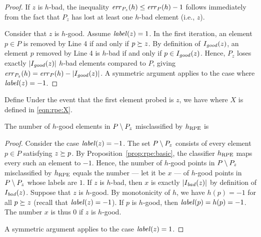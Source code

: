     \begin{proof}
        If $z$ is $h$-bad, the inequality $\mathit{err}_{P_z}(h) \le \mathit{err}_P(h) - 1$ follows immediately from the fact that $P_z$ has lost at least one $h$-bad element (i.e., $z$).

        \vgap

        Consider that $z$ is $h$-good. Assume $\mathit{label}(z) = 1$. In the first iteration, an element $p \in P$ is removed by Line 4 if and only if $p \succeq z$. By definition of $I_\mathit{good}(z)$, an element $p$ removed by Line 4 is $h$-bad if and only if $p \in I_\mathit{good}(z)$. Hence, $P_z$ loses exactly $|I_\mathit{good}(z)|$ $h$-bad elements compared to $P$, giving $\mathit{err}_{P_z}(h) = \mathit{err}_P(h) - |I_\mathit{good}(z)|$. A symmetric argument applies to the case where $\mathit{label}(z) = -1$.
    \end{proof}

    Define
    Under the event that the first element probed is $z$, we have
    where $X$ is defined in \eqref{eqn:rpe:X}.

    \begin{proposition} \label{prop:rpe:err-P-Pz}
        The number of $h$-good elements in $P \setminus P_z$ misclassified by $h_{\mathrm{RPE}}$ is
    \end{proposition}

    \begin{proof}
        Consider the case $\mathit{label}(z) = -1$. The set $P \setminus P_z$ consists of every element $p \in P$ satisfying $z \succeq p$. By Proposition~\ref{prop:rpe:basic}, the classifier $h_{\mathrm{RPE}}$ maps every such an element to $-1$. Hence, the number of $h$-good points in $P \setminus P_z$ misclassified by $h_{\mathrm{RPE}}$ equals the number --- let it be $x$ --- of $h$-good points in $P \setminus P_z$ whose labels are $1$. If $z$ is $h$-bad, then $x$ is exactly $|I_\mathit{bad}(z)|$ by definition of $I_\mathit{bad}(z)$. Suppose that $z$ is $h$-good. By monotonicity of $h$, we have $h(p) = -1$ for all $p \succeq z$ (recall that $\mathit{label}(z) = -1$). If $p$ is $h$-good, then $\mathit{label}(p) = h(p) = -1$. {The number $x$} is thus 0 if $z$ is $h$-good.

        \vgap

        A symmetric argument applies to the case $\mathit{label}(z) = 1$.
    \end{proof}

